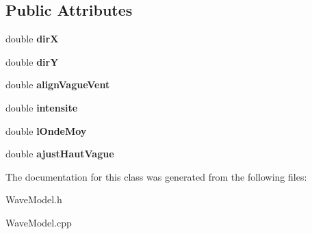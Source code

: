 \subsection*{Public Attributes}
\begin{DoxyCompactItemize}
\item 
\hypertarget{class_wave_model_ab4822ed59164d1c8316e23452c7bee83}{}\label{class_wave_model_ab4822ed59164d1c8316e23452c7bee83} 
double {\bfseries dirX}
\item 
\hypertarget{class_wave_model_a7fbe1eaf5059ef0b3dba4b0052db5446}{}\label{class_wave_model_a7fbe1eaf5059ef0b3dba4b0052db5446} 
double {\bfseries dirY}
\item 
\hypertarget{class_wave_model_aae60d61d9b0e55999ef05bb5deb5ac04}{}\label{class_wave_model_aae60d61d9b0e55999ef05bb5deb5ac04} 
double {\bfseries align\+Vague\+Vent}
\item 
\hypertarget{class_wave_model_a2bda2f93c3cc1cebcb9d7d3c7c4e52a8}{}\label{class_wave_model_a2bda2f93c3cc1cebcb9d7d3c7c4e52a8} 
double {\bfseries intensite}
\item 
\hypertarget{class_wave_model_ac9f38b5b6a556fd4b1e0d0b97916df05}{}\label{class_wave_model_ac9f38b5b6a556fd4b1e0d0b97916df05} 
double {\bfseries l\+Onde\+Moy}
\item 
\hypertarget{class_wave_model_a2bdc077ae85c1eca6e46fe67936fbf23}{}\label{class_wave_model_a2bdc077ae85c1eca6e46fe67936fbf23} 
double {\bfseries ajust\+Haut\+Vague}
\end{DoxyCompactItemize}


The documentation for this class was generated from the following files\+:\begin{DoxyCompactItemize}
\item 
Wave\+Model.\+h\item 
Wave\+Model.\+cpp\end{DoxyCompactItemize}
